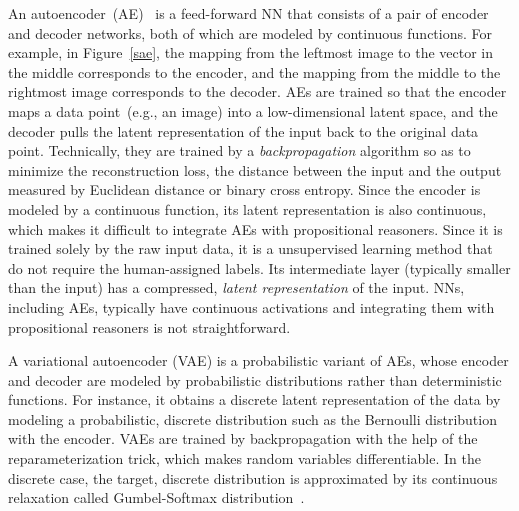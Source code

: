 An autoencoder~(AE)~\cite{hinton2006reducing} is a feed-forward NN that consists of a pair of encoder and decoder networks, both of which are modeled by continuous functions.
For example, in Figure~\ref{sae}, the mapping from the leftmost image to the vector in the middle corresponds to the encoder, and the mapping from the middle to the rightmost image corresponds to the decoder.
AEs are trained so that the encoder maps a data point~(e.g., an image) into a low-dimensional latent space, and the decoder pulls the latent representation of the input back to the original data point.
Technically, they are trained by a \emph{backpropagation} algorithm so as to minimize the reconstruction loss, the distance between the input and the output measured by Euclidean distance or binary cross entropy.
Since the encoder is modeled by a continuous function, its latent representation is also continuous, which makes it difficult to integrate AEs with propositional reasoners.
Since it is trained solely by the raw input data, it is a unsupervised learning method that do not require the human-assigned labels.
Its intermediate layer (typically smaller than the input) has a compressed, \emph{latent representation} of the input.
NNs, including AEs, typically have continuous activations and integrating them with propositional reasoners is not straightforward.
\fi

A variational autoencoder (VAE) \cite{kingma2013auto} is a probabilistic variant of AEs, whose encoder and decoder are modeled by probabilistic distributions rather than deterministic functions.
For instance,
it obtains a discrete latent representation of the data by modeling a probabilistic, discrete distribution such as the Bernoulli distribution with the encoder.
VAEs are trained by backpropagation with the help of the reparameterization trick, which makes random variables differentiable.
In the discrete case, the target, discrete distribution is approximated by its continuous relaxation called Gumbel-Softmax distribution~\cite{jang2016categorical}.


